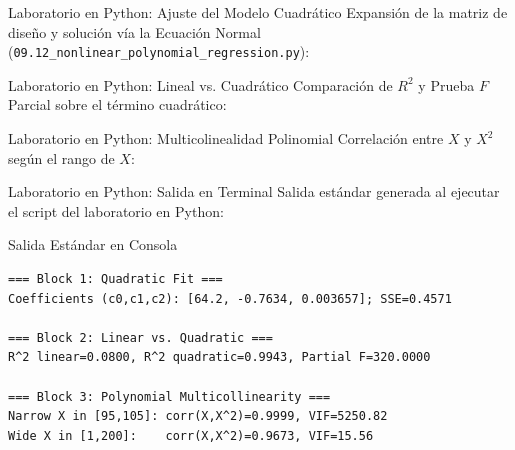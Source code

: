 \documentclass[10pt, aspectratio=169]{beamer}
\begin{document}
\begin{frame}[fragile]{Laboratorio en Python: Ajuste del Modelo Cuadrático}
  \scriptsize
  Expansión de la matriz de diseño y solución vía la Ecuación Normal (\texttt{09.12\_nonlinear\_polynomial\_regression.py}):
  {
  }
\end{frame}

\begin{frame}[fragile]{Laboratorio en Python: Lineal vs. Cuadrático}
  \scriptsize
  Comparación de $R^2$ y Prueba $F$ Parcial sobre el término cuadrático:
  {
  }
\end{frame}

\begin{frame}[fragile]{Laboratorio en Python: Multicolinealidad Polinomial}
  \scriptsize
  Correlación entre $X$ y $X^2$ según el rango de $X$:
  {
  }
\end{frame}

\begin{frame}[fragile]{Laboratorio en Python: Salida en Terminal}
  \scriptsize
  Salida estándar generada al ejecutar el script del laboratorio en Python:
  \vspace{0.02cm}
  \begin{block}{Salida Estándar en Consola}
    \fontsize{3.2pt}{3.9pt}\selectfont
    \begin{verbatim}
=== Block 1: Quadratic Fit ===
Coefficients (c0,c1,c2): [64.2, -0.7634, 0.003657]; SSE=0.4571

=== Block 2: Linear vs. Quadratic ===
R^2 linear=0.0800, R^2 quadratic=0.9943, Partial F=320.0000

=== Block 3: Polynomial Multicollinearity ===
Narrow X in [95,105]: corr(X,X^2)=0.9999, VIF=5250.82
Wide X in [1,200]:    corr(X,X^2)=0.9673, VIF=15.56
    \end{verbatim}
  \end{block}
\end{frame}
\end{document}
